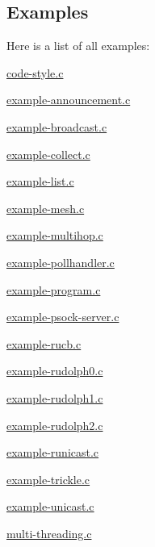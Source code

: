\subsection{\-Examples}
\-Here is a list of all examples\-:\begin{DoxyCompactItemize}
\item 
\hyperlink{a00001}{code-\/style.\-c}
\item 
\hyperlink{a00007}{example-\/announcement.\-c}
\item 
\hyperlink{a00008}{example-\/broadcast.\-c}
\item 
\hyperlink{a00009}{example-\/collect.\-c}
\item 
\hyperlink{a00004}{example-\/list.\-c}
\item 
\hyperlink{a00010}{example-\/mesh.\-c}
\item 
\hyperlink{a00011}{example-\/multihop.\-c}
\item 
\hyperlink{a00003}{example-\/pollhandler.\-c}
\item 
\hyperlink{a00002}{example-\/program.\-c}
\item 
\hyperlink{a00005}{example-\/psock-\/server.\-c}
\item 
\hyperlink{a00012}{example-\/rucb.\-c}
\item 
\hyperlink{a00013}{example-\/rudolph0.\-c}
\item 
\hyperlink{a00014}{example-\/rudolph1.\-c}
\item 
\hyperlink{a00015}{example-\/rudolph2.\-c}
\item 
\hyperlink{a00016}{example-\/runicast.\-c}
\item 
\hyperlink{a00017}{example-\/trickle.\-c}
\item 
\hyperlink{a00018}{example-\/unicast.\-c}
\item 
\hyperlink{a00006}{multi-\/threading.\-c}
\end{DoxyCompactItemize}
